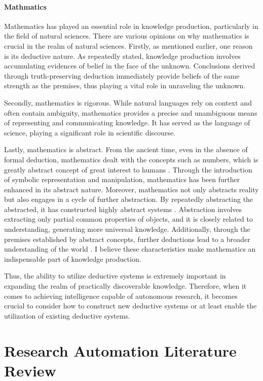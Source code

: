 \documentclass{book}
\begin{document}
\subsubsection{Mathmatics}
Mathematics has played an essential role in knowledge production, particularly in the field of natural sciences. There are various opinions on why mathematics is crucial in the realm of natural sciences. Firstly, as mentioned earlier, one reason is its deductive nature. As repeatedly stated, knowledge production involves accumulating evidences of belief in the face of the unknown. Conclusions derived through truth-preserving deduction immediately provide beliefs of the same strength as the premises, thus playing a vital role in unraveling the unknown. 

Secondly, mathematics is rigorous. While natural languages rely on context and often contain ambiguity, mathematics provides a precise and unambiguous means of representing and communicating knowledge. It has served as the language of science, playing a significant role in scientific discourse.

Lastly, mathematics is abstract. From the ancient time, even in the absence of formal deduction, mathematics dealt with the concepts such as numbers, which is greatly abstract concept of great interest to humans \cite{david2010history}. Through the introduction of symbolic representation and manipulation, mathematics has been further enhanced in its abstract nature. Moreover, mathematics not only abstracts reality but also engages in a cycle of further abstraction. By repeatedly abstracting the abstracted, it has constructed highly abstract systems \cite{bochner1966role}. Abstraction involves extracting only partial common properties of objects, and it is closely related to understanding, generating more universal knowledge. Additionally, through the premises established by abstract concepts, further deductions lead to a broader understanding of the world \cite{heisenberg2008abstraction}. I believe these characteristics make mathematics an indispensable part of knowledge production. 

Thus, the ability to utilize deductive systems is extremely important in expanding the realm of practically discoverable knowledge. Therefore, when it comes to achieving intelligence capable of autonomous research, it becomes crucial to consider how to construct new deductive systems or at least enable the utilization of existing deductive systems.

\chapter{Research Automation Literature Review}
\end{document}
